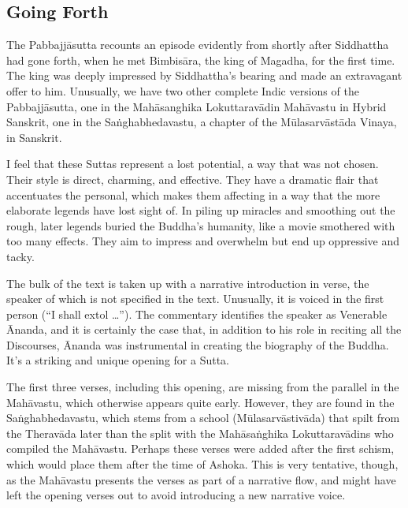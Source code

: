 \documentclass[12pt,openany]{book}%
\begin{document}
\subsection*{Going Forth}

The \textsanskrit{Pabbajjāsutta} recounts an episode evidently from shortly after Siddhattha had gone forth, when he met \textsanskrit{Bimbisāra}, the king of Magadha, for the first time. The king was deeply impressed by Siddhattha’s bearing and made an extravagant offer to him. Unusually, we have two other complete Indic versions of the \textsanskrit{Pabbajjāsutta}, one in the \textsanskrit{Mahāsanghika} \textsanskrit{Lokuttaravādin} \textsanskrit{Mahāvastu} in Hybrid Sanskrit, one in the \textsanskrit{Saṅghabhedavastu}, a chapter of the \textsanskrit{Mūlasarvāstāda} Vinaya, in Sanskrit.

I feel that these Suttas represent a lost potential, a way that was not chosen. Their style is direct, charming, and effective. They have a dramatic flair that accentuates the personal, which makes them affecting in a way that the more elaborate legends have lost sight of. In piling up miracles and smoothing out the rough, later legends buried the Buddha’s humanity, like a movie smothered with too many effects. They aim to impress and overwhelm but end up oppressive and tacky.

The bulk of the text is taken up with a narrative introduction in verse, the speaker of which is not specified in the text. Unusually, it is voiced in the first person (“I shall extol …”). The commentary identifies the speaker as Venerable Ānanda, and it is certainly the case that, in addition to his role in reciting all the Discourses, Ānanda was instrumental in creating the biography of the Buddha. It’s a striking and unique opening for a Sutta.

The first three verses, including this opening, are missing from the parallel in the \textsanskrit{Mahāvastu}, which otherwise appears quite early. However, they are found in the \textsanskrit{Saṅghabhedavastu}, which stems from a school (\textsanskrit{Mūlasarvāstivāda}) that spilt from the \textsanskrit{Theravāda} later than the split with the \textsanskrit{Mahāsaṅghika} \textsanskrit{Lokuttaravādins} who compiled the \textsanskrit{Mahāvastu}. Perhaps these verses were added after the first schism, which would place them after the time of Ashoka. This is very tentative, though, as the \textsanskrit{Mahāvastu} presents the verses as part of a narrative flow, and might have left the opening verses out to avoid introducing a new narrative voice.
\end{document}
